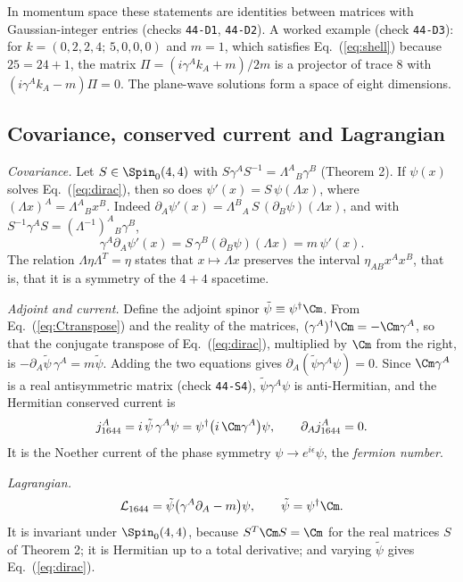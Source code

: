 In momentum space these statements are identities between matrices with Gaussian-integer entries
(checks \texttt{44-D1}, \texttt{44-D2}). A worked example (check \texttt{44-D3}): for
$k=(0,2,2,4;\,5,0,0,0)$ and $m=1$, which satisfies Eq.~(\ref{eq:shell}) because $25=24+1$, the matrix
$\Pi=(i\gamma^Ak_A+m)/2m$ is a projector of trace 8 with $(i\gamma^Ak_A-m)\Pi=0$. The plane-wave
solutions form a space of eight dimensions.

\subsection{Covariance, conserved current and Lagrangian}

\emph{Covariance.} Let $S\in\Spin_0(4,4)$ with $S\gamma^AS^{-1}=\Lambda^A{}_B\gamma^B$
(Theorem 2). If $\psi(x)$ solves Eq.~(\ref{eq:dirac}), then so does
$\psi'(x)=S\,\psi(\Lambda x)$, where $(\Lambda x)^A=\Lambda^A{}_Bx^B$. Indeed
$\partial_A\psi'(x)=\Lambda^B{}_A\,S\,(\partial_B\psi)(\Lambda x)$, and with
$S^{-1}\gamma^AS=(\Lambda^{-1})^A{}_B\gamma^B$,
\begin{equation}
\gamma^A\partial_A\psi'(x)=S\,\gamma^B(\partial_B\psi)(\Lambda x)=m\,\psi'(x).
\end{equation}
The relation $\Lambda\eta\Lambda^T=\eta$ states that $x\mapsto\Lambda x$ preserves the interval
$\eta_{AB}x^Ax^B$, that is, that it is a symmetry of the $4+4$ spacetime.

\emph{Adjoint and current.} Define the adjoint spinor $\tilde\psi\equiv\psi^\dagger\Cm$. From
Eq.~(\ref{eq:Ctranspose}) and the reality of the matrices, $(\gamma^A)^\dagger\Cm=-\Cm\gamma^A$, so
that the conjugate transpose of Eq.~(\ref{eq:dirac}), multiplied by $\Cm$ from the right, is
$-\partial_A\tilde\psi\,\gamma^A=m\tilde\psi$. Adding the two equations gives
$\partial_A(\tilde\psi\gamma^A\psi)=0$. Since $\Cm\gamma^A$ is a real antisymmetric matrix (check
\texttt{44-S4}), $\tilde\psi\gamma^A\psi$ is anti-Hermitian, and the Hermitian conserved current is
\begin{equation}
j_{1644}^A=i\,\tilde\psi\,\gamma^A\psi=\psi^\dagger\big(i\,\Cm\gamma^A\big)\psi,\qquad\partial_Aj_{1644}^A=0 .
\label{eq:current}
\end{equation}
It is the Noether current of the phase symmetry $\psi\to e^{i\epsilon}\psi$, the \emph{fermion
number}.

\emph{Lagrangian.}
\begin{equation}
\mathcal{L}_{1644}=\tilde\psi\big(\gamma^A\partial_A-m\big)\psi,\qquad\tilde\psi=\psi^\dagger\Cm .
\label{eq:lagrangian}
\end{equation}
It is invariant under $\Spin_0(4,4)$, because $S^T\Cm S=\Cm$ for the real matrices $S$ of Theorem 2;
it is Hermitian up to a total derivative; and varying $\tilde\psi$ gives Eq.~(\ref{eq:dirac}).

